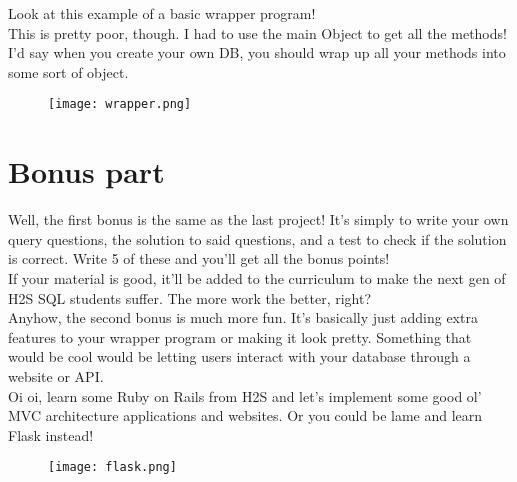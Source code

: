 \documentclass{42-en}
\begin{document}
	Look at this example of a basic wrapper program! \\ 
	This is pretty poor, though. I had to use the main Object to get all the methods! 
	I'd say when you create your own DB, you should wrap up all your methods into some 
	sort of object. \\ 

	\begin{figure}[H]
		\begin{center}
			\texttt{[image: wrapper.png]}
		\end{center}
	\end{figure}

\nextexercice


\chapter{Bonus part}
	Well, the first bonus is the same as the last project! It's simply to write your 
	own query questions, the solution to said questions, and a test to check if the 
	solution is correct. Write 5 of these and you'll get all the bonus points! \\ 

	If your material is good, it'll be added to the curriculum to make the 
	next gen of H2S SQL students suffer. The more work the better, right? \\ 

	Anyhow, the second bonus is much more fun. It's basically just adding extra 
	features to your wrapper program or making it look pretty. Something that would be 
	cool would be letting users interact with your database through a website or API. \\ 

	Oi oi, learn some Ruby on Rails from H2S and let's implement some good ol' MVC 
	architecture applications and websites. Or you could be lame and learn Flask instead! 

	\begin{figure}[H]
		\begin{center}
			\texttt{[image: flask.png]}
		\end{center}
	\end{figure}
\end{document}
